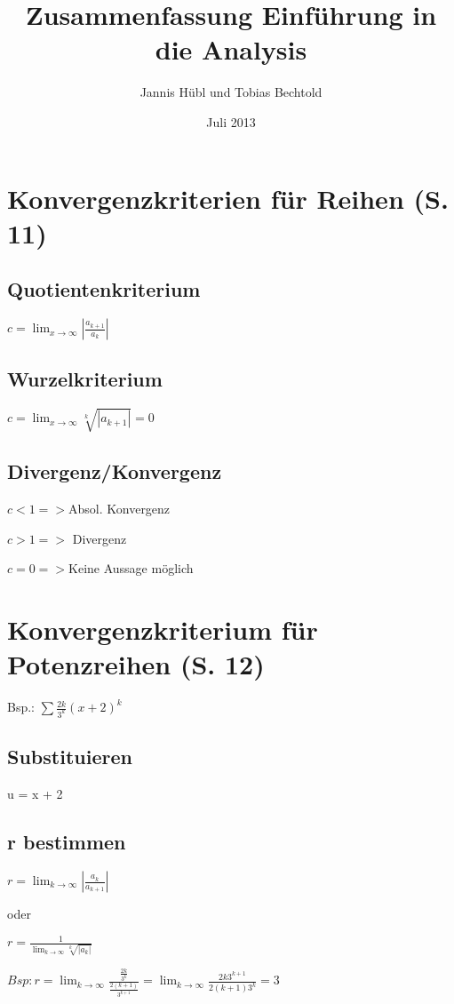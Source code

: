 \documentclass[a4paper, 11pt]{article}
\title{Zusammenfassung Einführung in die Analysis}
\author{Jannis Hübl und Tobias Bechtold}
\date{Juli 2013}
\begin{document}
\maketitle
\newpage
\tableofcontents
\newpage
\section{Konvergenzkriterien für Reihen (S. 11)}

\subsection{Quotientenkriterium}


$ c = \lim_{x \to \infty} |\frac {a_{k+1}} {a_{k}}|$


\subsection{Wurzelkriterium}

$ c = \lim_{x \to \infty} \sqrt[k]{|a_{k+1}|} = 0 $

\subsection{Divergenz/Konvergenz}

$ c < 1 => $Absol. Konvergenz

$ c > 1 => $ Divergenz

$ c = 0 => $Keine Aussage möglich

\section{Konvergenzkriterium für Potenzreihen (S. 12)}

Bsp.: $ \sum \frac{2k}{3^k} (x + 2)^k$

\subsection {Substituieren}
u = x + 2

\subsection {r bestimmen}

$ r = \lim_{k \to \infty} |\frac{a_k}{a_{k+1}}| $

oder

$ r = \frac {1} {\lim_{k \to \infty} \sqrt[k]{|a_k|}}$

$Bsp: r = \lim_{k \to
\infty} \frac {\frac {2k} {3^k}}{\frac{2(k+1)}{3^{k+1}}} = \lim_{k \to \infty}
\frac {2k 3^{k+1}}{2(k+1) 3^k} = 3$
\end{document}
